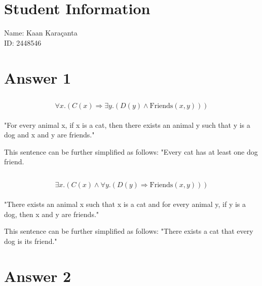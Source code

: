 \documentclass[12pt]{article}
\begin{document}
\section*{Student Information}

Name: Kaan Karaçanta \\

ID: 2448546 \\


\section*{Answer 1}

\subsection*{}

\[ \forall x.\left(C(x) \Rightarrow \exists y.\left(D(y) \land \text{Friends}(x, y)\right)\right) \] \\

"For every animal x, if x is a cat, then there exists an animal y such that y is a dog and x and y are friends."

This sentence can be further simplified as follows: 
"Every cat has at least one dog friend.

\subsection*{}

\[ \exists x.\left(C(x) \land \forall y.\left(D(y) \Rightarrow \text{Friends}(x, y)\right)\right) \] \\

"There exists an animal x such that x is a cat and for every animal y, if y is a dog, then x and y are friends."

This sentence can be further simplified as follows:
"There exists a cat that every dog is its friend."


\section*{Answer 2}
\end{document}
